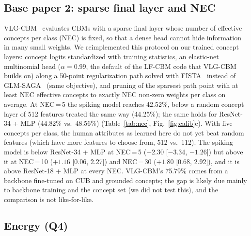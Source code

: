 \documentclass[conference]{IEEEtran}
\begin{document}
\subsection{Base paper 2: sparse final layer and NEC}
VLG-CBM~\cite{srivastava2024vlgcbm} evaluates CBMs with a sparse final layer whose number of effective concepts per class (NEC) is fixed, so that a dense head cannot hide information in many small weights. We reimplemented this protocol on our trained concept layers: concept logits standardized with training statistics, an elastic-net~\cite{zou2005regularization} multinomial head ($\alpha=0.99$, the default of the LF-CBM code that VLG-CBM builds on) along a 50-point regularization path solved with FISTA~\cite{beck2009fast} instead of GLM-SAGA~\cite{wong2021leveraging} (same objective), and pruning of the sparsest path point with at least NEC effective concepts to exactly NEC non-zero weights per class on average. At NEC\,=\,5 the spiking model reaches 42.52\%, below a random concept layer of 512 features treated the same way (44.25\%); the same holds for ResNet-34 + MLP (44.82\% vs.\ 48.56\%) (Table~\ref{tab:nec}, Fig.~\ref{fig:calib}c). With five concepts per class, the human attributes as learned here do not yet beat random features (which have more features to choose from, 512 vs.\ 112). The spiking model is below ResNet-34 + MLP at NEC\,=\,5 ($-2.30$ [$-3.34$, $-1.26$]) but above it at NEC\,=\,10 ($+1.16$ [0.06, 2.27]) and NEC\,=\,30 ($+1.80$ [0.68, 2.92]), and it is above ResNet-18 + MLP at every NEC. VLG-CBM's 75.79\% comes from a backbone fine-tuned on CUB and grounded concepts; the gap is likely due mainly to backbone training and the concept set (we did not test this), and the comparison is not like-for-like.

\subsection{Energy (Q4)}
\end{document}
